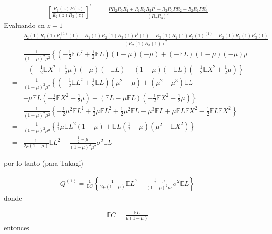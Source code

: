 \documentclass{article}
\newcommand{\esp}{\mathbb{E}}
\begin{document}
\begin{eqnarray}\label{Eq.Primer.Derivada.Q}
\left[\frac{R_{1}\left(z\right)P\left(z\right)}{R_{2}\left(z\right)R_{3}\left(z\right)}\right]^{'}&=&\frac{PR_{2}R_{3}R_{1}^{'}
+R_{1}R_{2}R_{3}P^{'}-R_{3}R_{1}PR_{2}-R_{2}R_{1}PR_{3}^{'}}{\left(R_{2}R_{3}\right)^{2}}
\end{eqnarray}
Evaluando en $z=1$
\begin{eqnarray*}
&=&\frac{R_{2}(1)R_{3}(1)R_{1}^{(1)}(1)+R_{1}(1)R_{2}(1)R_{3}(1)P^{'}(1)-R_{3}(1)R_{1}(1)R_{2}(1)^{(1)}-R_{2}(1)R_{1}(1)R_{3}^{'}(1)}{\left(R_{2}(1)R_{3}(1)\right)^{2}}\\
&=&\frac{1}{\left(1-\mu\right)^{2}\mu^{2}}\left\{\left(-\frac{1}{2}\esp L^{2}+\frac{1}{2}\esp L\right)\left(1-\mu\right)\left(-\mu\right)+\left(-\esp L\right)\left(1-\mu\right)\left(-\mu\right)\mu\right.\\
&&\left.-\left(-\frac{1}{2}\esp X^{2}+\frac{1}{2}\mu\right)\left(-\mu\right)\left(-\esp L\right)-\left(1-\mu\right)\left(-\esp L\right)\left(-\frac{1}{2}\esp X^{2}+\frac{1}{2}\mu\right)\right\}\\
&=&\frac{1}{\left(1-\mu\right)^{2}\mu^{2}}\left\{\left(-\frac{1}{2}\esp L^{2}+\frac{1}{2}\esp L\right)\left(\mu^{2}-\mu\right)
+\left(\mu^{2}-\mu^{3}\right)\esp L\right.\\
&&\left.-\mu\esp L\left(-\frac{1}{2}\esp X^{2}+\frac{1}{2}\mu\right)
+\left(\esp L-\mu\esp L\right)\left(-\frac{1}{2}\esp X^{2}+\frac{1}{2}\mu\right)\right\}\\
&=&\frac{1}{\left(1-\mu\right)^{2}\mu^{2}}\left\{-\frac{1}{2}\mu^{2}\esp L^{2}
+\frac{1}{2}\mu\esp L^{2}
+\frac{1}{2}\mu^{2}\esp L
-\mu^{3}\esp L
+\mu\esp L\esp X^{2}
-\frac{1}{2}\esp L\esp X^{2}\right\}\\
&=&\frac{1}{\left(1-\mu\right)^{2}\mu^{2}}\left\{
\frac{1}{2}\mu\esp L^{2}\left(1-\mu\right)
+\esp L\left(\frac{1}{2}-\mu\right)\left(\mu^{2}-\esp X^{2}\right)\right\}\\
&=&\frac{1}{2\mu\left(1-\mu\right)}\esp L^{2}-\frac{\frac{1}{2}-\mu}{\left(1-\mu\right)^{2}\mu^{2}}\sigma^{2}\esp L
\end{eqnarray*}

por lo tanto (para Takagi)

\begin{eqnarray*}
Q^{(1)}=\frac{1}{\esp C}\left\{\frac{1}{2\mu\left(1-\mu\right)}\esp L^{2}-\frac{\frac{1}{2}-\mu}{\left(1-\mu\right)^{2}\mu^{2}}\sigma^{2}\esp L\right\}
\end{eqnarray*}
donde 

\begin{eqnarray*}
\esp C = \frac{\esp L}{\mu\left(1-\mu\right)}
\end{eqnarray*}
entonces
\end{document}
